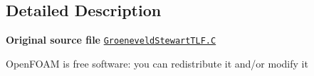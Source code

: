 \subsection{Detailed Description}
{\bfseries Original source file} \href{../../../home/carlo/data/GeN-Foam/GeN-Foam_ffn/GeN-Foam/GeN-Foam/classes/thermalHydraulics/src/physicsModels/heatTransferModels/FSHeatTransferCoefficientModels/subModels/CHFModels/LeidenFrostTemperatureModels/GroeneveldStewart/GroeneveldStewartTLF.C}{\tt Groeneveld\+Stewart\+T\+L\+F.\+C}

Open\+F\+O\+AM is free software\+: you can redistribute it and/or modify it 